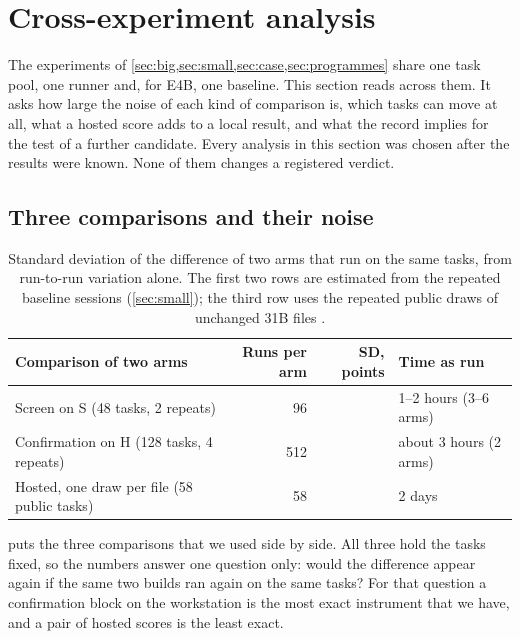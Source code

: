 \section{Cross-experiment analysis}\label{sec:analysis}

The experiments of \cref{sec:big,sec:small,sec:case,sec:programmes} share one task pool, one runner and, for E4B, one
baseline. This section reads across them. It asks how large the noise of each kind of comparison is, which tasks can
move at all, what a hosted score adds to a local result, and what the record implies for the test of a further
candidate. Every analysis in this section was chosen after the results were known. None of them changes a registered
verdict.

\subsection{Three comparisons and their noise}\label{sec:noise}

\begin{table}[t]
\centering
\caption{Standard deviation of the difference of two arms that run on the same tasks, from run-to-run variation
alone. The first two rows are estimated from the repeated baseline sessions (\cref{sec:small}); the third row uses
the repeated public draws of unchanged 31B files \citep{afshar2026census}.}
\label{tab:noise}
\footnotesize
\begin{tabular}{lrrl}
\toprule
Comparison of two arms & Runs per arm & SD, points & Time as run \\
\midrule
Screen on S (48 tasks, 2 repeats) & 96 & \ScreenSdDiffPts{} & 1--2 hours (3--6 arms) \\
Confirmation on H (128 tasks, 4 repeats) & 512 & \NoiseSdDiffPts{} & about 3 hours (2 arms) \\
Hosted, one draw per file (58 public tasks) & 58 & \HostedSdDiffPts{} & 2 days \\
\bottomrule
\end{tabular}
\end{table}

 puts the three comparisons that we used side by side. All three hold the tasks fixed, so the numbers
answer one question only: would the difference appear again if the same two builds ran again on the same tasks? For
that question a confirmation block on the workstation is the most exact instrument that we have, and a pair of hosted
scores is the least exact.

